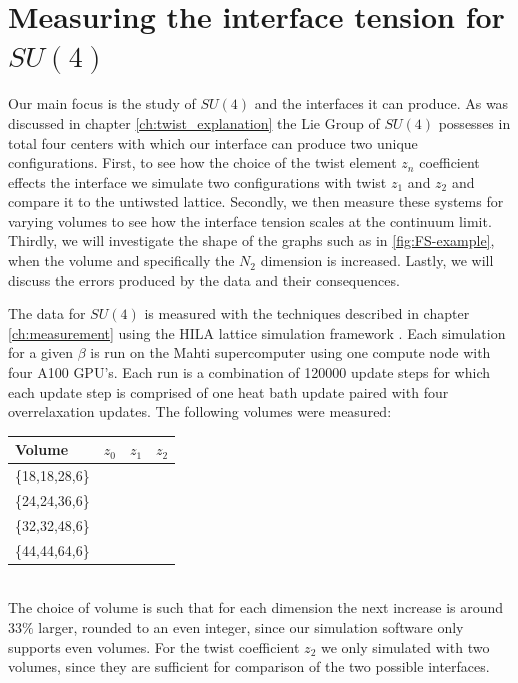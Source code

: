 \documentclass[english,twoside,openright]{UH_TCM_MSc}
\newcommand{\cmark}{\ding{51}}%
\newcommand{\xmark}{\ding{55}}%
\begin{document}
\section{Measuring the interface tension for $SU(4)$}

Our main focus is the study of $SU(4)$ and the interfaces it can produce. As was discussed in chapter \ref{ch:twist_explanation} the Lie Group of $SU(4)$ possesses in total four centers with which our interface can produce two unique configurations. First, to see how the choice of the twist element $z_n$ coefficient effects the interface we simulate two configurations with twist $z_1$ and $z_2$ and compare it to the untiwsted lattice. Secondly, we then measure these systems for varying volumes to see how the interface tension scales at the continuum limit. Thirdly, we will investigate the shape of the graphs such as in \ref{fig:FS-example}, when the volume and specifically the $N_2$ dimension is increased. Lastly, we will discuss the errors produced by the data and their consequences.

The data for $SU(4)$ is measured with the techniques described in chapter \ref{ch:measurement} using the HILA lattice simulation framework \cite{HILA}. Each simulation for a given $\beta$ is run on the Mahti supercomputer \cite{cscMahtiDocs} using one compute node with four A100 GPU's. Each run is a combination of 120000 update steps for which each update step is comprised of one heat bath update paired with four overrelaxation updates. The following volumes were measured:
\begin{table}[h!]
\centering
\begin{tabular}{|l|l|l|l|}
\hline
Volume        & $z_0$ & $z_1$ & $z_2$ \\ \hline
\{18,18,28,6\} & \cmark   & \cmark &   \xmark   \\ \hline
\{24,24,36,6\} & \cmark  &  \cmark   &   \cmark   \\ \hline
\{32,32,48,6\} & \cmark   &  \cmark   &  \xmark   \\ \hline
\{44,44,64,6\} & \cmark   &  \cmark   &  \cmark    \\ \hline
\end{tabular}
\end{table}\\
The choice of volume is such that for each dimension the next increase is around $33\%$ larger, rounded to an even integer, since our simulation software only supports even volumes. For the twist coefficient $z_2$ we only simulated with two volumes, since they are sufficient for comparison of the two possible interfaces.
\end{document}
